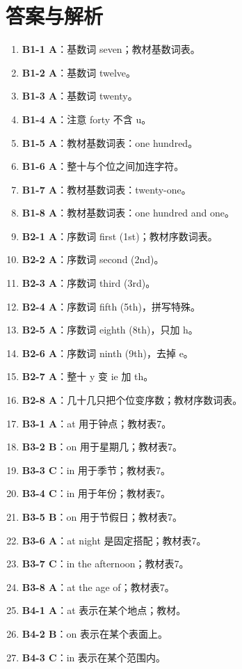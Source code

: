\documentclass[11pt,a4paper]{ctexart}
\begin{document}
\section*{答案与解析}
\small
\begin{enumerate}[leftmargin=1.6em,itemsep=2pt]
\item \textbf{B1-1 A}：基数词 seven；教材基数词表。
\item \textbf{B1-2 A}：基数词 twelve。
\item \textbf{B1-3 A}：基数词 twenty。
\item \textbf{B1-4 A}：注意 forty 不含 u。
\item \textbf{B1-5 A}：教材基数词表：one hundred。
\item \textbf{B1-6 A}：整十与个位之间加连字符。
\item \textbf{B1-7 A}：教材基数词表：twenty-one。
\item \textbf{B1-8 A}：教材基数词表：one hundred and one。
\item \textbf{B2-1 A}：序数词 first (1st)；教材序数词表。
\item \textbf{B2-2 A}：序数词 second (2nd)。
\item \textbf{B2-3 A}：序数词 third (3rd)。
\item \textbf{B2-4 A}：序数词 fifth (5th)，拼写特殊。
\item \textbf{B2-5 A}：序数词 eighth (8th)，只加 h。
\item \textbf{B2-6 A}：序数词 ninth (9th)，去掉 e。
\item \textbf{B2-7 A}：整十 y 变 ie 加 th。
\item \textbf{B2-8 A}：几十几只把个位变序数；教材序数词表。
\item \textbf{B3-1 A}：at 用于钟点；教材表7。
\item \textbf{B3-2 B}：on 用于星期几；教材表7。
\item \textbf{B3-3 C}：in 用于季节；教材表7。
\item \textbf{B3-4 C}：in 用于年份；教材表7。
\item \textbf{B3-5 B}：on 用于节假日；教材表7。
\item \textbf{B3-6 A}：at night 是固定搭配；教材表7。
\item \textbf{B3-7 C}：in the afternoon；教材表7。
\item \textbf{B3-8 A}：at the age of；教材表7。
\item \textbf{B4-1 A}：at 表示在某个地点；教材。
\item \textbf{B4-2 B}：on 表示在某个表面上。
\item \textbf{B4-3 C}：in 表示在某个范围内。

\end{enumerate}
\end{document}
